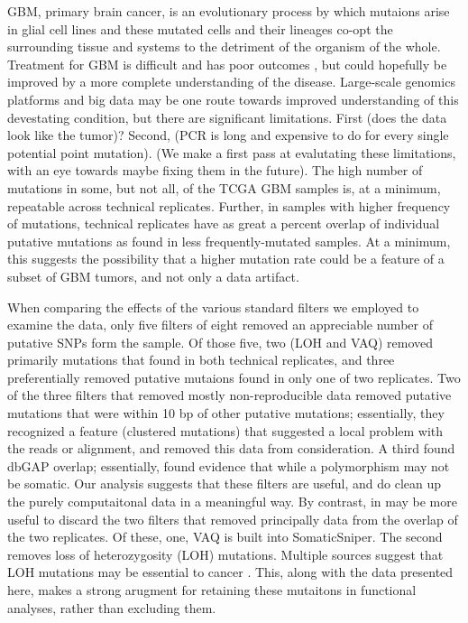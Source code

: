 \documentclass[11pt]{article} %
\begin{document}
GBM, primary brain cancer, is an evolutionary process by which mutaions arise in glial cell lines and these mutated cells and their lineages co-opt the surrounding tissue and systems to the detriment of the organism of the whole. Treatment for GBM is difficult and has poor outcomes \cite{GBM-treatments}, but could hopefully be improved by a more complete understanding of the disease. Large-scale genomics platforms and big data may be one route towards improved understanding of this devestating condition, but there are significant limitations. First (does the data look like the tumor)? Second, (PCR is long and expensive to do for every single potential point mutation). (We make a first pass at evalutating these limitations, with an eye towards maybe fixing them in the future).   
The high number of mutations in some, but not all, of the TCGA GBM samples is, at a minimum, repeatable across technical replicates. Further, in samples with higher frequency of mutations, technical replicates have as great a percent overlap of individual putative mutations as found in less frequently-mutated samples. At a minimum, this suggests the possibility that a higher mutation rate could be a feature of a subset of GBM tumors, and not only a data artifact.

When comparing the effects of the various standard filters we employed to examine the data, only five filters of eight removed an appreciable number of putative SNPs form the sample. Of those five, two (LOH and VAQ) removed primarily mutations that found in both technical replicates, and three preferentially removed putative mutaions found in only one of two replicates. Two of the three filters that removed mostly non-reproducible data removed putative mutations that were within 10 bp of other putative mutations; essentially, they recognized a feature (clustered mutations) that suggested a local problem with the reads or alignment, and removed this data from consideration. A third found dbGAP overlap; essentially, found evidence that while a polymorphism may not be somatic. Our analysis suggests that these filters are useful, and do clean up the purely computaitonal data in a meaningful way.
By contrast, in may be more useful to discard the two filters that removed principally data from the overlap of the two replicates. Of these, one, VAQ is built into SomaticSniper. The second removes loss of heterozygosity (LOH) mutations. Multiple sources suggest that LOH mutations may be essential to cancer \cite{LOH}. This, along with the data presented here, makes a strong arugment for retaining these mutaitons in functional analyses, rather than excluding them.
\end{document}
